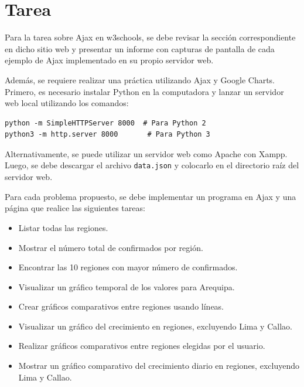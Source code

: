 \documentclass{article}
\begin{document}
	\section{Tarea}
	\begin{itemize}		
Para la tarea sobre Ajax en w3schools, se debe revisar la sección correspondiente en dicho sitio web y presentar un informe con capturas de pantalla de cada ejemplo de Ajax implementado en su propio servidor web.

Además, se requiere realizar una práctica utilizando Ajax y Google Charts. Primero, es necesario instalar Python en la computadora y lanzar un servidor web local utilizando los comandos:
\begin{verbatim}
python -m SimpleHTTPServer 8000  # Para Python 2
python3 -m http.server 8000       # Para Python 3
\end{verbatim}
Alternativamente, se puede utilizar un servidor web como Apache con Xampp. Luego, se debe descargar el archivo \texttt{data.json} y colocarlo en el directorio raíz del servidor web.

Para cada problema propuesto, se debe implementar un programa en Ajax y una página que realice las siguientes tareas:
\begin{itemize}
    \item Listar todas las regiones.
    \item Mostrar el número total de confirmados por región.
    \item Encontrar las 10 regiones con mayor número de confirmados.
    \item Visualizar un gráfico temporal de los valores para Arequipa.
    \item Crear gráficos comparativos entre regiones usando líneas.
    \item Visualizar un gráfico del crecimiento en regiones, excluyendo Lima y Callao.
    \item Realizar gráficos comparativos entre regiones elegidas por el usuario.
    \item Mostrar un gráfico comparativo del crecimiento diario en regiones, excluyendo Lima y Callao.
\end{itemize}
	\end{itemize}
		
\end{document}
